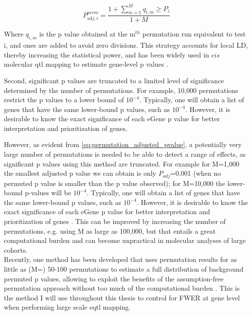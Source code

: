\begin{equation}\label{eq:permutation_adjusted_pvalue}
    P_{adj,i}^{perm} = \frac{1+\sum_{m=1}^{M} q_{i,m} \geq P_i}{1+M}
\end{equation}

Where $q_{i,m}$ is the p value obtained at the m$^{th}$ permutation run equivalent to test i, and ones are added to avoid zero divisions.  
This strategy accounts for local LD, thereby increasing the statistical power, and has been widely used in $cis$ molecular \gls{qtl} mapping to estimate gene-level p values \cite{gtex2015genotype}.  

Second, significant p values are truncated to a limited level of significance determined by the number of permutations. For example, 10,000 permutations restrict the p values to a lower bound of $10^{-4}$. Typically, one will obtain a list of genes that have the same lower-bound p values, such as $10^{-4}$. However, it is desirable to know the exact significance of each eGene p value for better interpretation and prioritization of genes.

However, as evident from \eqref{eq:permutation_adjusted_pvalue}, a potentially very large number of permutations is needed to be able to detect a range of effects, as significant p values using this method are truncated.
For example for M=1,000 the smallest adjusted p value we can obtain is only $P_{adj}$=0.001 (when no permuted p value is smaller than the p value observed); for M=10,000 the lower-bound p-values will be $10^{-4}$. 
Typically, one will obtain a list of genes that have the same lower-bound p values, such as $10^{-4}$. 
However, it is desirable to know the exact significance of each eGene p value for better interpretation and prioritization of genes \cite{sul2015accurate}.
This can be improved by increasing the number of permutations, e.g. using M as large as 100,000, but that entails a great computational burden and can become unpractical in molecular analyses of large cohorts.\\

Recently, one method has been developed that uses permutation results for as little as (M=) 50-100 permutations to estimate a full distribution of background permuted p values, allowing to exploit the benefits of the assumption-free permutation approach without too much of the computational burden \cite{ongen2016fast}. 
This is the method I will use throughout this thesis to control for FWER at gene level when performing large scale e\gls{qtl} mapping.

